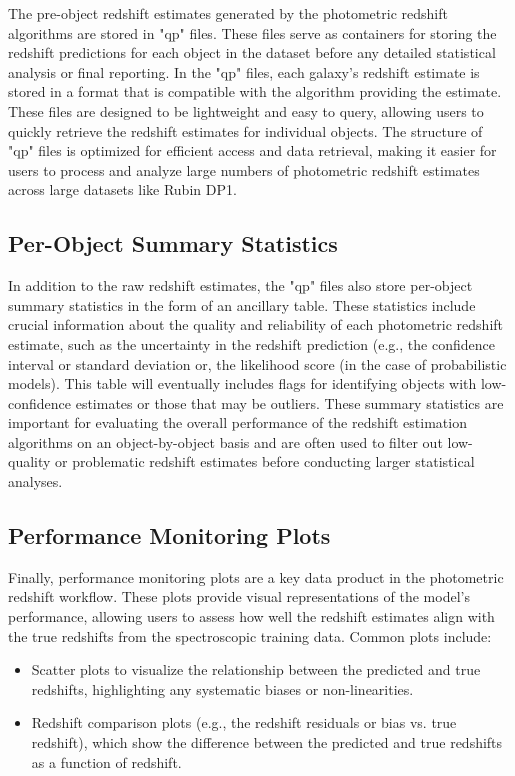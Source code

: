 The pre-object redshift estimates generated by the photometric redshift algorithms are stored in "qp" files.  These files serve as containers for storing the redshift predictions for each object in the dataset before any detailed statistical analysis or final reporting. In the "qp" files, each galaxy’s redshift estimate is stored in a format that is compatible with the algorithm providing the estimate.  These files are designed to be lightweight and easy to query, allowing users to quickly retrieve the redshift estimates for individual objects. The structure of "qp" files is optimized for efficient access and data retrieval, making it easier for users to process and analyze large numbers of photometric redshift estimates across large datasets like Rubin DP1.


\subsection{Per-Object Summary Statistics}
\label{sec: products:summary_statistics}

In addition to the raw redshift estimates, the "qp" files also store per-object summary statistics in the form of an ancillary table. These statistics include crucial information about the quality and reliability of each photometric redshift estimate, such as the uncertainty in the redshift prediction (e.g., the confidence interval or standard deviation or, the likelihood score (in the case of probabilistic models).   This table will eventually includes flags for identifying objects with low-confidence estimates or those that may be outliers. These summary statistics are important for evaluating the overall performance of the redshift estimation algorithms on an object-by-object basis and are often used to filter out low-quality or problematic redshift estimates before conducting larger statistical analyses.

\subsection{Performance Monitoring Plots}
\label{sec: products:peformance_plots}

Finally, performance monitoring plots are a key data product in the photometric redshift workflow. These plots provide visual representations of the model's performance, allowing users to assess how well the redshift estimates align with the true redshifts from the spectroscopic training data. Common plots include:

\begin{itemize}
\item{Scatter plots to visualize the relationship between the predicted and true redshifts, highlighting any systematic biases or non-linearities.}
\item{Redshift comparison plots (e.g., the redshift residuals or bias vs. true redshift), which show the difference between the predicted and true redshifts as a function of redshift.}
\end{itemize}



